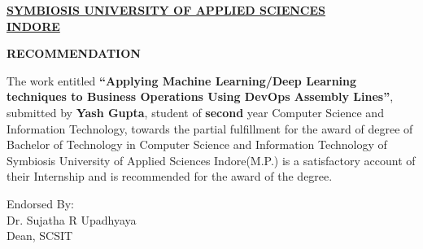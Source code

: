 \documentclass[12pt,oneside,a4paper]{report}
\begin{document}
\newpage 
\begin{large}
\begin{center}
\fontsize{18pt}{10pt}\selectfont
\underline{\textbf{SYMBIOSIS UNIVERSITY OF APPLIED SCIENCES}}\\
\vspace{5.0mm}\underline{\textbf{INDORE}}
\end{center}
\end{large}
\vspace{1.0in}
\begin{large}
\begin{center}
\fontsize{16pt}{10pt}\selectfont
\textbf{RECOMMENDATION}
\end{center}
\end{large}
\vspace{0.8in}
The work entitled \textbf{“Applying Machine Learning/Deep Learning techniques to Business Operations Using DevOps Assembly Lines”}, submitted by \textbf{Yash Gupta}, student of \textbf{second} year Computer Science and Information Technology, towards the partial fulfillment for the award of degree of Bachelor of Technology in Computer Science and Information Technology of Symbiosis University of Applied Sciences Indore(M.P.) is a satisfactory account of their Internship and is recommended for the award of the degree.\\
\vspace{1.2in}
\begin{flushleft}
Endorsed By:\\Dr. Sujatha R Upadhyaya\\
Dean, SCSIT
\end{flushleft}
\end{document}

